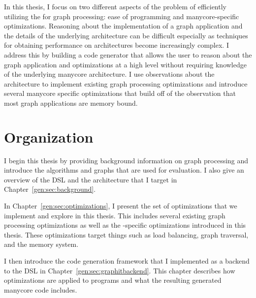 In this thesis, I focus on two different aspects of the problem of efficiently utilizing the \hbmc for graph processing: ease of programming and manycore-specific optimizations. 
Reasoning about the implementation of a graph application and the details of the underlying architecture can be difficult especially as techniques for obtaining performance on architectures become increasingly complex. 
I address this by building a code generator that allows the user to reason about the graph application and optimizations at a high level without requiring knowledge of the underlying manycore architecture.
I use observations about the \hb architecture to implement existing graph processing optimizations and introduce several manycore specific optimizations that build off of the observation that most graph applications are memory bound. 


\section{Organization}

I begin this thesis by providing background information on graph processing and introduce the algorithms and graphs that are used for evaluation.
I also give an overview of the \graphit DSL and the \hbmc architecture that I target in Chapter~\ref{gen:sec:background}.

In Chapter~\ref{gen:sec:optimizations}, I present the set of optimizations that we implement and explore in this thesis.
This includes several existing graph processing optimizations as well as the \hbmc-specific optimizations introduced in this thesis.
These optimizations target things such as load balancing, graph traversal, and the \hb memory system. 

I then introduce the code generation framework that I implemented as a backend to the \graphit DSL in Chapter~\ref{gen:sec:graphitbackend}.
This chapter describes how optimizations are applied to programs and what the resulting generated manycore code includes.

